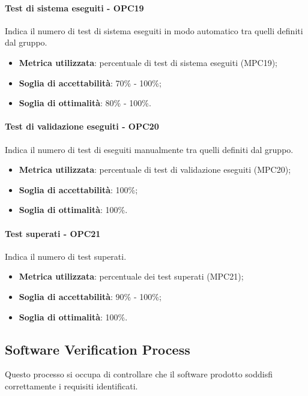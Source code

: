 \documentclass[PdQ.tex]{subfiles}
\begin{document}
			\paragraph{Test di sistema eseguiti - OPC19}
				Indica il numero di test di sistema eseguiti in modo automatico tra quelli definiti dal gruppo.
				\begin{itemize}
					\item \textbf{Metrica utilizzata}: percentuale di test di sistema eseguiti (MPC19);
					\item \textbf{Soglia di accettabilità}: 70\% - 100\%;
					\item \textbf{Soglia di ottimalità}: 80\% - 100\%.
				\end{itemize}

			\paragraph{Test di validazione eseguiti - OPC20}
				Indica il numero di test di  eseguiti manualmente tra quelli definiti dal gruppo.
				\begin{itemize}
					\item \textbf{Metrica utilizzata}: percentuale di test di validazione eseguiti (MPC20);
					\item \textbf{Soglia di accettabilità}: 100\%;
					\item \textbf{Soglia di ottimalità}: 100\%.
				\end{itemize}

			\paragraph{Test superati - OPC21}
				Indica il numero di test superati.
				\begin{itemize}
					\item \textbf{Metrica utilizzata}: percentuale dei test superati (MPC21);
					\item \textbf{Soglia di accettabilità}: 90\% - 100\%;
					\item \textbf{Soglia di ottimalità}: 100\%.
				\end{itemize}
	\subsection{Software Verification Process}
		Questo processo si occupa di controllare che il software prodotto soddisfi correttamente i requisiti identificati.
\end{document}

